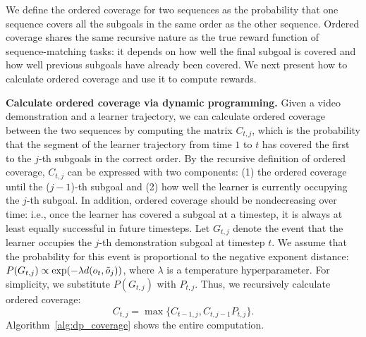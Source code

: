 

We define the ordered coverage for two sequences as the probability that one sequence covers all the subgoals in the same order as the other sequence.
Ordered coverage shares the same recursive nature as the true reward function of sequence-matching tasks: it depends on how well the final subgoal is covered and how well previous subgoals have already been covered. 
We next present how to calculate ordered coverage and use it to compute rewards.

\textbf{Calculate ordered coverage via dynamic programming.}
Given a video demonstration and a learner trajectory, we can calculate ordered coverage between the two sequences by computing the matrix $C_{t,j}$, which is the probability that the segment of the learner trajectory from time $1$ to $t$ has covered the first to the $j$-th subgoals in the correct order.
By the recursive definition of ordered coverage, $C_{t,j}$ can be expressed with two components: (1) the ordered coverage until the ($j-1$)-th subgoal and (2) how well the learner is currently occupying the $j$-th subgoal. 
In addition, ordered coverage should be nondecreasing over time: i.e., once the learner has covered a subgoal at a timestep, it is always at least equally successful in future timesteps.
Let $G_{t,j}$ denote the event that the learner occupies the $j$-th demonstration subgoal at timestep $t$.
We assume that the probability for this event is proportional to the negative exponent distance:
$P(G_{t,j}) \propto \exp(-\lambda d(o_t, \tilde{o}_{j}))$, where $\lambda$ is a temperature hyperparameter. 
For simplicity, we substitute $P(G_{t,j})$ with $P_{t,j}$.
Thus, we recursively calculate ordered coverage:
\begin{equation}\label{eq:coverage_recursive}
    C_{t,j} = \max \{C_{t-1, j}, C_{t, j-1}P_{t,j}\}.
\end{equation}
Algorithm~\ref{alg:dp_coverage} shows the entire computation. 

